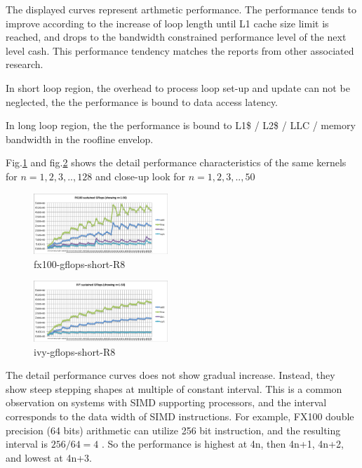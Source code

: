\documentclass[conference]{IEEEtran}
\begin{document}
The displayed curves represent arthmetic performance.
The performance tends to improve according to the increase of
loop length until L1 cache size limit is reached, and drops to
the bandwidth constrained performance level of the next level cash.
This performance tendency matches the reports from other associated research.

In short loop region,
the overhead to process loop set-up and update can not be neglected,
the the performance is bound to data access latency.

In long loop region,
the the performance is bound to
L1\$ / L2\$ / LLC / memory bandwidth in the roofline envelop.

\cite{Williams:2009:RIV:1498765.1498785} 

Fig.\ref{fig:fx100-gflops-short-R8} and fig.\ref{fig:ivy-gflops-short-R8}
shows the detail performance characteristics of the same kernels for
\begin{math}
n=1,2,3,..,128
\end{math}
and close-up look for
\begin{math}
n=1,2,3,..,50
\end{math}


\begin{figure}[bt]
\centering
\includegraphics[width=0.45\textwidth]{figs/fx100-gflops-short-R8.pdf}
\caption{fx100-gflops-short-R8}
\label{fig:fx100-gflops-short-R8}
\end{figure}

\begin{figure}[bt]
\centering
\includegraphics[width=0.45\textwidth]{figs/ivy-gflops-short-R8.pdf}
\caption{ivy-gflops-short-R8}
\label{fig:ivy-gflops-short-R8}
\end{figure}

The detail performance curves does not show gradual increase. Instead, they
show steep stepping shapes at multiple of constant interval.
This is a common observation on systems with SIMD supporting processors,
and the interval corresponds to the data width of SIMD instructions.
For example, FX100 double precision (64 bits) arithmetic can utilize
256 bit instruction, and the resulting interval is
\begin{math}
256 / 64 = 4
\end{math}
.
So the performance is highest at 4n, then 4n+1, 4n+2, and lowest at 4n+3.
\end{document}
